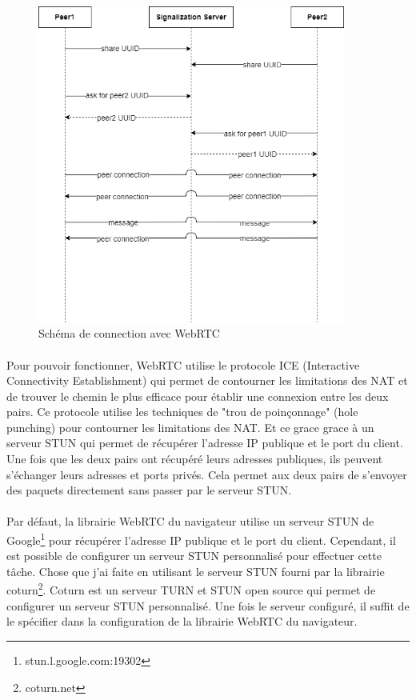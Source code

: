 \begin{figure}[h]
    \centering
    \includegraphics[width=0.9\textwidth]{assets/webrtc.png}
    \caption{Schéma de connection avec WebRTC}
    \label{fig:webrtc}
\end{figure}

\newpage

\paragraph{}
Pour pouvoir fonctionner, WebRTC utilise le protocole ICE (Interactive Connectivity Establishment) qui permet de contourner les limitations des NAT et de trouver le chemin le plus efficace pour établir une connexion entre les deux pairs. 
Ce protocole utilise les techniques de "trou de poinçonnage" (hole punching) pour contourner les limitations des NAT. Et ce grace grace à un serveur STUN qui permet de récupérer l'adresse IP publique et le port du client.
Une fois que les deux pairs ont récupéré leurs adresses publiques, ils peuvent s'échanger leurs adresses et ports privés. Cela permet aux deux pairs de s'envoyer des paquets directement sans passer par le serveur STUN. 

\paragraph{}
Par défaut, la librairie WebRTC du navigateur utilise un serveur STUN de Google\footnote{stun.l.google.com:19302} pour récupérer l'adresse IP publique et le port du client. Cependant, il est possible de configurer un serveur STUN personnalisé pour effectuer cette tâche.
Chose que j'ai faite en utilisant le serveur STUN fourni par la librairie coturn\footnote{coturn.net}. Coturn est un serveur TURN et STUN open source qui permet de configurer un serveur STUN personnalisé. Une fois le serveur configuré, il suffit de le spécifier dans 
la configuration de la librairie WebRTC du navigateur.

